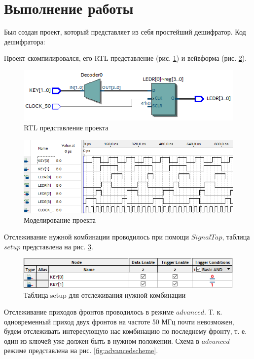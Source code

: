 \documentclass[a4paper,14pt]{article}
\begin{document}
	\section{Выполнение работы}
	
	Был создан проект, который представляет из себя простейший дешифратор.
	Код дешифратора:
	
	{\small {}}
	
	Проект скомпилировался, его RTL представление (рис. \ref{fig:rtl}) и вейвформа (рис. \ref{fig:wvf}).
	
	\begin{figure}[H]
		\centering
		\includegraphics[width=0.6\linewidth]{images/RTL}
		\caption{RTL представление проекта}
		\label{fig:rtl}
	\end{figure}

	\begin{figure}[H]
		\centering
		\includegraphics[width=0.6\linewidth]{images/WVF}
		\caption{Моделирование проекта}
		\label{fig:wvf}
	\end{figure}
	
	Отслеживание нужной комбинации проводилось при помощи $SignalTap$, таблица $setup$ представлена на рис. \ref{fig:setupkey1}.
	
	\begin{figure}[H]
		\centering
		\includegraphics[width=0.7\linewidth]{images/setup_key_1}
		\caption{Таблица setup для отслеживания нужной комбинации}
		\label{fig:setupkey1}
	\end{figure}

	
	Отслеживание приходов фронтов проводилось в режиме $advanced$.
	Т. к. одновременный приход двух фронтов на частоте 50 МГц почти невозможен, будем отслеживать интересующую нас комбинацию по последнему фронту, т. е. один из ключей уже должен быть в нужном положении.
	Схема в $advanced$ режиме представлена на рис. \ref{fig:advancedscheme}.
	
\end{document}
